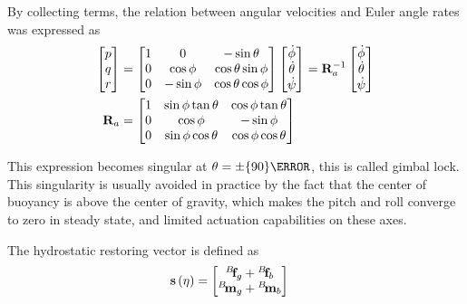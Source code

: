 By collecting terms, the relation between angular velocities and Euler angle rates was expressed as
\begin{align}
	\begin{bmatrix}
		\scal{p} \\ \scal{q} \\ \scal{r}
	\end{bmatrix} & =
	\begin{bmatrix}
		1 & 0                  & -\sin{\scal{\theta}}                 \\
		0 & \cos{\scal{\phi}}  & \cos{\scal{\theta}}\sin{\scal{\phi}} \\
		0 & -\sin{\scal{\phi}} & \cos{\scal{\theta}}\cos{\scal{\phi}}
	\end{bmatrix}
	\begin{bmatrix}
		\scal{\dot{\phi}} \\ \scal{\dot{\theta}} \\ \scal{\dot{\psi}}
	\end{bmatrix} =
	\lrmatr{R}{-1}{a}
	\begin{bmatrix}
		\scal{\dot{\phi}} \\ \scal{\dot{\theta}} \\ \scal{\dot{\psi}}
	\end{bmatrix} \\
	\lrdmatr{R}{a}                   & =
	\begin{bmatrix}
		1 & \sin{\scal{\phi}}\tan{\scal{\theta}} & \cos{\scal{\phi}}\tan{\scal{\theta}} \\
		0 & \cos{\scal{\phi}}                    & -\sin{\scal{\phi}}                   \\
		0 & \sin{\scal{\phi}}\cos{\scal{\theta}} & \cos{\scal{\phi}}\cos{\scal{\theta}}
	\end{bmatrix}
\end{align}

This expression becomes singular at $\scal{\theta} = \pm{}\qty{90}{\degree}$, this is called gimbal
lock. This singularity is usually avoided in practice by the fact that the center of buoyancy is
above the center of gravity, which makes the pitch and roll converge to zero in steady state, and
limited actuation capabilities on these axes.

\trigft{}

The hydrostatic restoring vector is defined as
\begin{align}
	\vect{s}\left(\vect{\eta}\right) & =
	\begin{bmatrix}
		\fldvect{f}{B}{g} + \fldvect{f}{B}{b} \\
		\fldvect{m}{B}{g} + \fldvect{m}{B}{b}
	\end{bmatrix}
\end{align}

